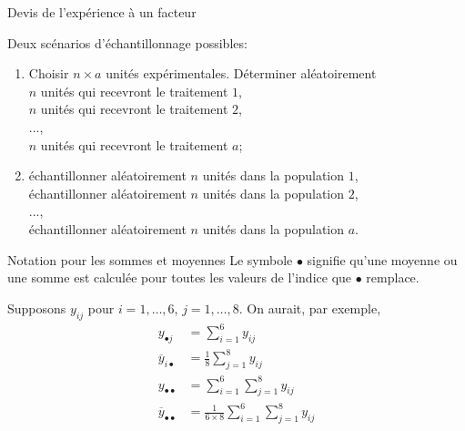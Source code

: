 \documentclass{BeamerTemplate}
\begin{document}
\begin{frame}[t]{Devis de l'expérience à un facteur}

{\small

Deux scénarios d'échantillonnage possibles:%
\begin{enumerate}
\item<1-> Choisir $n\times a$ unités expérimentales. Déterminer aléatoirement\\
$n$ unités qui recevront le traitement $1$, \\
$n$ unités qui recevront le traitement $2$, \\...,\\
$n$ unités qui recevront le traitement $a$;
\item<2-> échantillonner aléatoirement $n$ unités dans la population $1$,\\
échantillonner aléatoirement $n$ unités dans la population $2$, \\...,\\
échantillonner aléatoirement $n$ unités dans la population $a$.
\end{enumerate}

}
\end{frame}
\begin{frame}[t]{Notation pour les sommes et moyennes}
Le symbole $\bullet$ signifie qu'une moyenne ou une somme est calculée pour \alert{toutes les valeurs de l'indice que $\bullet$ remplace}.

\medskip
{\small
Supposons $y_{ij}$ pour $i=1,\ldots,6$, $j=1,\ldots,8$. On aurait, par exemple,
\begin{align*}
y_{\bullet j}&=\sum_{i=1}^6y_{ij}\\
\overline{y}_{i\bullet }&=\frac{1}{8}\sum_{j=1}^8y_{ij}\\
y_{\bullet\bullet}&=\sum_{i=1}^6\sum_{j=1}^8y_{ij}\\
\overline{y}_{\bullet \bullet}&=\frac{1}{6\times 8}\sum_{i=1}^6\sum_{j=1}^8y_{ij}
\end{align*}

}
\end{frame}
\end{document}
